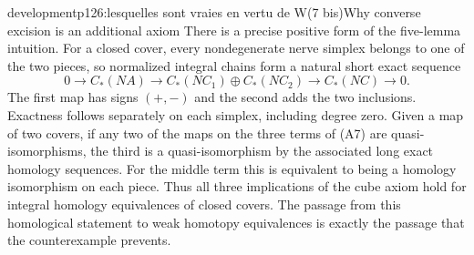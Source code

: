 \begin{dcomment}{development}{p126:lesquelles sont vraies en vertu de W(7 bis)}{Why converse excision is an additional axiom}
There is a precise positive form of the five-lemma intuition.  For a closed cover, every nondegenerate nerve simplex belongs to one of the two pieces, so normalized integral chains form a natural short exact sequence
\[
 0\longrightarrow C_*(NA)
  \longrightarrow C_*(NC_1)\oplus C_*(NC_2)
  \longrightarrow C_*(NC)\longrightarrow0.
 \tag{A7}
\]
The first map has signs $(+,-)$ and the second adds the two inclusions.  Exactness follows separately on each simplex, including degree zero.  Given a map of two covers, if any two of the maps on the three terms of (A7) are quasi-isomorphisms, the third is a quasi-isomorphism by the associated long exact homology sequences.  For the middle term this is equivalent to being a homology isomorphism on each piece.  Thus all three implications of the cube axiom hold for integral homology equivalences of closed covers.  The passage from this homological statement to weak homotopy equivalences is exactly the passage that the counterexample prevents.
\end{dcomment}

